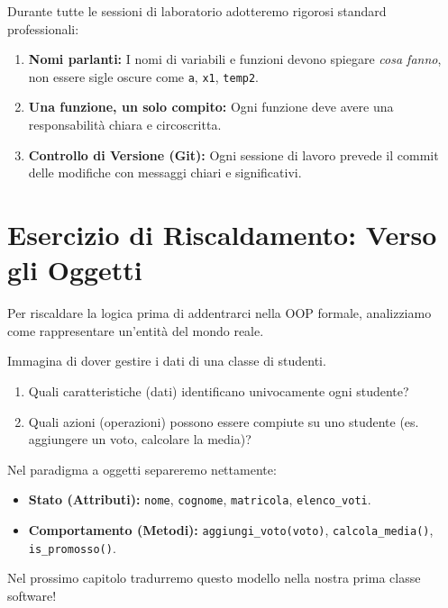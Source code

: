Durante tutte le sessioni di laboratorio adotteremo rigorosi standard professionali:

\begin{consiglio}
\begin{enumerate}
  \item \textbf{Nomi parlanti:} I nomi di variabili e funzioni devono spiegare \emph{cosa fanno}, non essere sigle oscure come \texttt{a}, \texttt{x1}, \texttt{temp2}.
  \item \textbf{Una funzione, un solo compito:} Ogni funzione deve avere una responsabilità chiara e circoscritta.
  \item \textbf{Controllo di Versione (Git):} Ogni sessione di lavoro prevede il commit delle modifiche con messaggi chiari e significativi.
\end{enumerate}
\end{consiglio}

\section{Esercizio di Riscaldamento: Verso gli Oggetti}

Per riscaldare la logica prima di addentrarci nella OOP formale, analizziamo come rappresentare un'entità del mondo reale.

\begin{esercizio}
Immagina di dover gestire i dati di una classe di studenti.
\begin{enumerate}
  \item Quali caratteristiche (dati) identificano univocamente ogni studente?
  \item Quali azioni (operazioni) possono essere compiute su uno studente (es. aggiungere un voto, calcolare la media)?
\end{enumerate}
\end{esercizio}

\begin{soluzione}
Nel paradigma a oggetti separeremo nettamente:
\begin{itemize}
  \item \textbf{Stato (Attributi):} \texttt{nome}, \texttt{cognome}, \texttt{matricola}, \texttt{elenco\_voti}.
  \item \textbf{Comportamento (Metodi):} \texttt{aggiungi\_voto(voto)}, \texttt{calcola\_media()}, \texttt{is\_promosso()}.
\end{itemize}
Nel prossimo capitolo tradurremo questo modello nella nostra prima classe software!
\end{soluzione}
